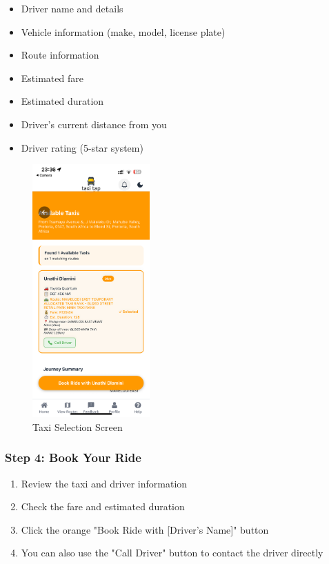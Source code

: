 \documentclass[12pt]{article}
\begin{document}
\begin{itemize}
    \item Driver name and details
    \item Vehicle information (make, model, license plate)
    \item Route information
    \item Estimated fare
    \item Estimated duration
    \item Driver's current distance from you
    \item Driver rating (5-star system)
\end{itemize}

\begin{figure}[H]
  \centering
  \includegraphics[width=0.4\textwidth]{taxi_selection.png}
  \caption{Taxi Selection Screen}
\end{figure}

\subsubsection{Step 4: Book Your Ride}
\begin{enumerate}
    \item Review the taxi and driver information
    \item Check the fare and estimated duration
    \item Click the orange "Book Ride with [Driver's Name]" button
    \item You can also use the "Call Driver" button to contact the driver directly
\end{enumerate}
\end{document}
